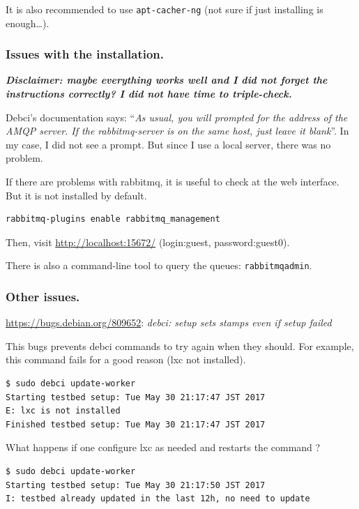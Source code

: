 \documentclass[mingoth,a4paper]{jsarticle}
\begin{document}
It is also recommended to use \texttt{apt-cacher-ng} (not sure if just
installing is enough\ldots{}).

\subsubsection{Issues with the
installation.}\label{issues-with-the-installation.}

\textbf{\emph{Disclaimer: maybe everything works well and I did not
forget the instructions correctly? I did not have time to
triple-check.}}

Debci's documentation says: ``\emph{As usual, you will prompted for the
address of the AMQP server. If the rabbitmq-server is on the same host,
just leave it blank}''. In my case, I did not see a prompt. But since I
use a local server, there was no problem.

If there are problems with rabbitmq, it is useful to check at the web
interface. But it is not installed by default.

\begin{verbatim}
rabbitmq-plugins enable rabbitmq_management
\end{verbatim}

Then, visit \url{http://localhost:15672/} (login:guest,
password:guest0).

There is also a command-line tool to query the queues:
\texttt{rabbitmqadmin}.

\subsubsection{Other issues.}\label{other-issues.}

\url{https://bugs.debian.org/809652}: \emph{debci: setup sets stamps
even if setup failed}

This bugs prevents debci commands to try again when they should. For
example, this command fails for a good reason (lxc not installed).

\begin{verbatim}
$ sudo debci update-worker
Starting testbed setup: Tue May 30 21:17:47 JST 2017
E: lxc is not installed
Finished testbed setup: Tue May 30 21:17:47 JST 2017
\end{verbatim}

What happens if one configure lxc as needed and restarts the command ?

\begin{verbatim}
$ sudo debci update-worker
Starting testbed setup: Tue May 30 21:17:50 JST 2017
I: testbed already updated in the last 12h, no need to update
\end{verbatim}
\end{document}
